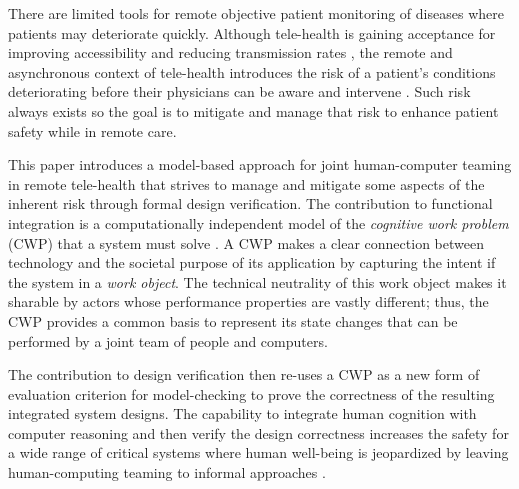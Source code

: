 There are limited tools for remote objective patient monitoring of diseases where patients may deteriorate quickly. Although tele-health is gaining acceptance for improving accessibility and reducing transmission rates \cite{10.1093/jamia/ocaa048,telehealth,10.1093/jamia/ocaa067}, the remote and asynchronous context of tele-health introduces the risk of a patient's conditions deteriorating before their physicians can be aware and intervene \cite{10.1097/ALN.0000000000003578}. Such risk always exists so the goal is to mitigate and manage that risk to enhance patient safety while in remote care. 

\begin{comment}
  Remote patient monitoring relies on clinicians, health IT, patients-caregivers, and other concurrent actors to each reliably perform various asynchronous tasks to coordinate patient care and safety \cite{remote,Aalam229}. Designing such systems becomes complex quickly because actors are outside the direct control of the system. These distributed and asynchronous characteristics make manual reasoning about functional integration and safety early in the design process very difficult; and yet, early in the design process is exactly the time to clearly establish the utility of the design in fulfilling its intended purpose. 
\end{comment}

This paper introduces a model-based approach for joint human-computer teaming in remote tele-health 
that strives to manage and mitigate some aspects of the inherent risk through formal design verification. The contribution to functional integration is a computationally independent model of the \emph{cognitive work problem} (CWP) that a system must solve \cite{workflowmodel,workcentered,BERRY201615,chi2010}. A CWP makes a clear connection between technology and the societal purpose of its application by capturing the intent if the system in a \emph{work object}. The technical neutrality of this work object makes it sharable by actors whose performance properties are vastly different; thus, the CWP provides a common basis to represent its state changes that can be performed by a joint team of people and computers. 

The contribution to design verification then re-uses a CWP as a new form of evaluation criterion for model-checking to prove the correctness of the resulting integrated system designs. The capability to integrate human cognition with computer reasoning and then verify the design correctness increases the safety for a wide range of critical systems where human well-being is jeopardized by leaving human-computing teaming to informal approaches \cite{remote,Aalam229}.

